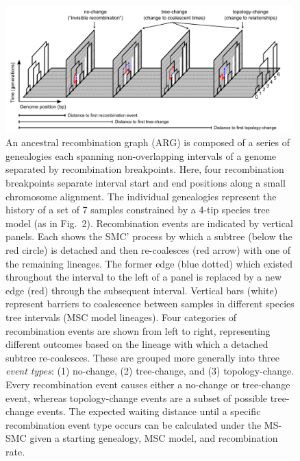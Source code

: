 \documentclass[11pt]{article}
\begin{document}
\begin{figure}[t]
	\centering
	\includegraphics[width=0.99\textwidth]{figures/current/Fig1-recomb-types-on-ARG.pdf}
	\caption{
		An ancestral recombination graph (ARG)
		is composed of a series of genealogies each spanning non-overlapping 
		intervals of a genome separated by recombination breakpoints. Here, 
		four recombination breakpoints separate interval
		start and end positions along a small chromosome alignment. 
		The individual genealogies represent the history of a set of 7 samples
		constrained by a 4-tip species tree model (as in Fig.~2).
		Recombination events are indicated by vertical panels. Each shows the SMC' process by 
		which a subtree (below the red circle) is detached and then re-coalesces (red arrow)
		with one of the remaining lineages.
		The former edge (blue dotted) which existed throughout the interval to the left of a 
		panel is replaced by a new edge (red) through the subsequent interval. 
		Vertical bars 
		(white) represent barriers to coalescence between samples in different species
		tree intervals (MSC model lineages).
		Four categories of recombination events are shown from left to right, representing
		different outcomes based on the lineage with which a detached subtree re-coalesces.
		These are grouped more generally into 
		three \emph{event types}: (1) no-change, (2) tree-change, and (3) topology-change.
		Every recombination event causes either a no-change or tree-change event, whereas
		topology-change events are a subset of possible tree-change events. The expected waiting
		distance until a specific recombination event type occurs can be calculated under 
		the MS-SMC given a starting genealogy, MSC model, and recombination rate.
	}
	\label{fig:ARG-cartoon}
\end{figure}
\end{document}
